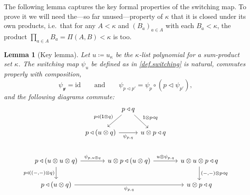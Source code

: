\documentclass[11pt, one side, article]{memoir}
\theoremstyle{definition}
\theoremstyle{plain}
\newtheorem{lemma}[definitionx]{Lemma}
\newcommand{\id}{\mathrm{id}}
\newcommand{\yon}{\mathcal{y}}
\newcommand{\0}{\textsf{0}}
\newcommand{\1}{\tn{\textsf{1}}}
\newcommand{\tri}{\mathbin{\triangleleft}}
\newcommand{\qqand}{\qquad\text{and}\qquad}
\begin{document}
The following lemma captures the key formal properties of the switching map. To prove it we will need the---so far unused---property of $\kappa$ that it is closed under its own products, i.e.\ that for any $A<\kappa$ and $(B_a)_{a\in A}$ with each $B_a<\kappa$, the product $\prod_{a\in A}B_a=\Pi(A,B)<\kappa$ is too.

\begin{lemma}[Key lemma]\label{lemma.key}
Let $u\coloneqq u_\kappa$ be the $\kappa$-list polynomial for a sum-product set $\kappa$. The switching map $\psi_u$ be defined as in \ref{def.switching} is natural, commutes properly with composition,
\[
	\psi_{\yon}=\id
	\qqand
	\psi_{p\tri p'}=\psi_{p}\circ (p\tri\psi_{p'}),
\]
and the following diagrams commute:
\begin{gather*}
\begin{tikzcd}[column sep=0, ampersand replacement=\&]
	\&p\tri q\ar[dl, "p\tri(\1\otimes q)"']\ar[dr,"\1\otimes p\tri q"]\\
	p\tri(u\otimes q)\ar[rr, "\psi_{p,q}"']\&\&u\otimes p\tri q
\end{tikzcd}
\\[15pt]
\begin{tikzcd}[, ampersand replacement=\&, column sep=large]
	p\tri(u\otimes u\otimes q)\ar[r, "\psi_{p,u\otimes q}"]\ar[d, "p\tri{((-,-)\otimes q)}"']\&
	u\otimes p\tri(u\otimes q)\ar[r, "u\otimes\psi_{p,q}"]\&
	u\otimes u\otimes p\tri q\ar[d, "{(-,-)}\otimes p\tri q"]\\
	p\tri (u\otimes q)\ar[rr, "\psi_{p,q}"']\&\&
	u\otimes p\tri q
\end{tikzcd}
\end{gather*}
\end{lemma}
\end{document}
